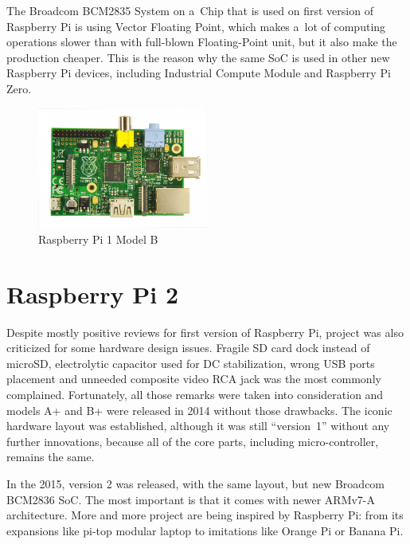\documentclass[printmode]{mgr}
\begin{document}
The Broadcom BCM2835 System on a~Chip that is used on first version of Raspberry Pi is using Vector Floating Point, which makes a~lot of computing operations slower than with full-blown Floating-Point unit, but it also make the production cheaper.
This is the reason why the same SoC is used in other new Raspberry Pi devices, including Industrial Compute Module and Raspberry Pi Zero.




\begin{figure}[htbp]
  \centering
    \includegraphics[width=0.5\textwidth]{raspberrypi-front.jpg}
  \caption{Raspberry Pi 1 Model B}
  \label{fig:devboard-raspberrypi}
\end{figure}


\section{Raspberry Pi 2}

Despite mostly positive reviews for first version of Raspberry Pi, project was also criticized for some hardware design issues.
Fragile SD card dock instead of microSD, electrolytic capacitor used for DC stabilization, wrong USB ports placement and unneeded composite video RCA jack was the most commonly complained.\cite{web:raspberrypi-issues}
Fortunately, all those remarks were taken into consideration and models A+ and B+ were released in 2014 without those drawbacks.
The iconic hardware layout was established, although it was still ``version~1'' without any further innovations, because all of the core parts, including micro-controller, remains the same.

In the 2015, version 2 was released, with the same layout, but new Broadcom BCM2836 SoC.
The most important is that it comes with newer ARMv7-A architecture.
More and more project are being inspired by Raspberry Pi: from its expansions like pi-top modular laptop to imitations like Orange Pi or Banana Pi.\cite{web:pi-top}
\end{document}
